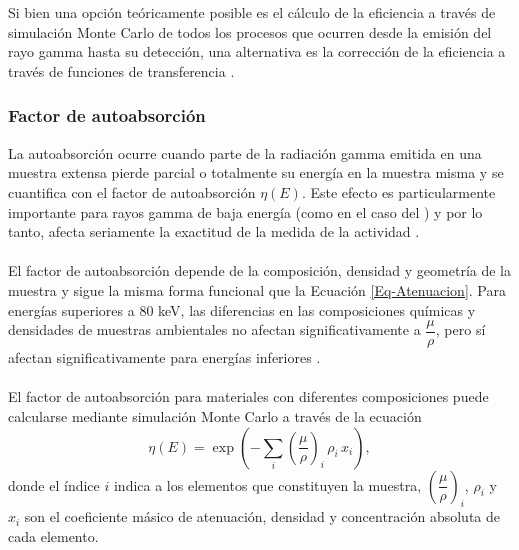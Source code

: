 \\ \\
Si bien una opción teóricamente posible es el cálculo de la eficiencia a través de simulación Monte Carlo de todos los procesos que ocurren desde la emisión del rayo gamma hasta su detección, una alternativa es la corrección de la eficiencia a través de funciones de transferencia \cite{VIDMAR2005603, MORERAGOMEZ201559}.
		\subsubsection{Factor de autoabsorción}\label{SubSecc-CoeffAtten}
La autoabsorción ocurre cuando parte de la radiación gamma emitida en una muestra extensa pierde parcial o totalmente su energía en la muestra misma y se cuantifica con el factor de autoabsorción $\eta(E)$. Este efecto es particularmente importante para rayos gamma de baja energía (como en el caso del \PbCero) y por lo tanto, afecta seriamente la exactitud de la medida de la actividad \cite{PILLEYRE2006323}.
\\
\\
El factor de autoabsorción depende de la composición, densidad y geometría de la muestra \cite{CUTSHALL1983309} y sigue la misma forma funcional que la Ecuación \ref{Eq-Atenuacion}. Para energías superiores a 80 keV, las diferencias en las composiciones químicas y densidades de muestras ambientales no afectan significativamente a $\dfrac{\mu}{\rho}$, pero sí afectan significativamente para energías inferiores \cite{VARGAS2002893}.
\\
\\
El factor de autoabsorción para materiales con diferentes composiciones puede calcularse mediante simulación Monte Carlo a través de la ecuación \cite{BELGIN201536, CUTSHALL1983309, APPLEBY1992228, APPLEBY2004423, PILLEYRE2006323, SAIDOU2007515}
\begin{equation}
\eta(E) = \exp\left(-\sum_i  \left( \dfrac{\mu}{\rho}\right)_i\,\rho_i\,x_i\right),
\end{equation}
donde el índice $i$ indica a los elementos que constituyen la muestra, $\left(\dfrac{\mu}{\rho}\right)_i$, $\rho_i $ y $x_i$ son el coeficiente másico de atenuación, densidad y concentración absoluta de cada elemento. 
